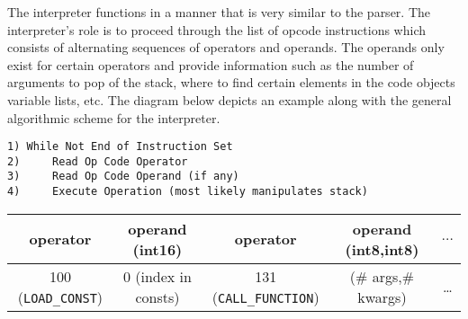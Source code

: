 \documentclass{article}
\begin{document}
The interpreter functions in a manner that is very similar to the parser.  The interpreter's role is to proceed through the list of opcode instructions which consists of alternating sequences of operators and operands.  The operands only exist for certain operators and provide information such as the number of arguments to pop of the stack, where to find certain elements in the code objects variable lists, etc.  The diagram below depicts an example along with the general algorithmic scheme for the interpreter.%
\begin{verbatim}
1) While Not End of Instruction Set
2)     Read Op Code Operator
3)     Read Op Code Operand (if any)
4)     Execute Operation (most likely manipulates stack)
\end{verbatim}
\begin{tabular}{ c | c | c | c | c }
operator & operand (int16) & operator & operand (int8,int8) & $\ldots$ \\ \hline
100 (\verb!LOAD_CONST!) & 0 (index in consts) & 131 (\verb!CALL_FUNCTION!) & (\# args,\# kwargs) & \ldots \\ \hline
\end{tabular}
\end{document}

